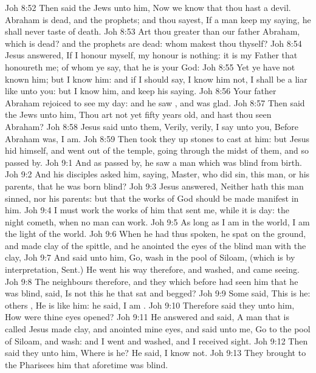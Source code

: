 \vs Joh 8:52 Then said the Jews unto him, Now we know that thou hast a devil. Abraham is dead, and the prophets; and thou sayest, If a man keep my saying, he shall never taste of death.
\vs Joh 8:53 Art thou greater than our father Abraham, which is dead? and the prophets are dead: whom makest thou thyself?
\vs Joh 8:54 Jesus answered, If I honour myself, my honour is nothing: it is my Father that honoureth me; of whom ye say, that he is your God:
\vs Joh 8:55 Yet ye have not known him; but I know him: and if I should say, I know him not, I shall be a liar like unto you: but I know him, and keep his saying.
\vs Joh 8:56 Your father Abraham rejoiced to see my day: and he saw , and was glad.
\vs Joh 8:57 Then said the Jews unto him, Thou art not yet fifty years old, and hast thou seen Abraham?
\vs Joh 8:58 Jesus said unto them, Verily, verily, I say unto you, Before Abraham was, I am.
\vs Joh 8:59 Then took they up stones to cast at him: but Jesus hid himself, and went out of the temple, going through the midst of them, and so passed by.
\vs Joh 9:1 And as  passed by, he saw a man which was blind from  birth.
\vs Joh 9:2 And his disciples asked him, saying, Master, who did sin, this man, or his parents, that he was born blind?
\vs Joh 9:3 Jesus answered, Neither hath this man sinned, nor his parents: but that the works of God should be made manifest in him.
\vs Joh 9:4 I must work the works of him that sent me, while it is day: the night cometh, when no man can work.
\vs Joh 9:5 As long as I am in the world, I am the light of the world.
\vs Joh 9:6 When he had thus spoken, he spat on the ground, and made clay of the spittle, and he anointed the eyes of the blind man with the clay,
\vs Joh 9:7 And said unto him, Go, wash in the pool of Siloam, (which is by interpretation, Sent.) He went his way therefore, and washed, and came seeing.
\vs Joh 9:8 The neighbours therefore, and they which before had seen him that he was blind, said, Is not this he that sat and begged?
\vs Joh 9:9 Some said, This is he: others , He is like him:  he said, I am .
\vs Joh 9:10 Therefore said they unto him, How were thine eyes opened?
\vs Joh 9:11 He answered and said, A man that is called Jesus made clay, and anointed mine eyes, and said unto me, Go to the pool of Siloam, and wash: and I went and washed, and I received sight.
\vs Joh 9:12 Then said they unto him, Where is he? He said, I know not.
\vs Joh 9:13 They brought to the Pharisees him that aforetime was blind.
